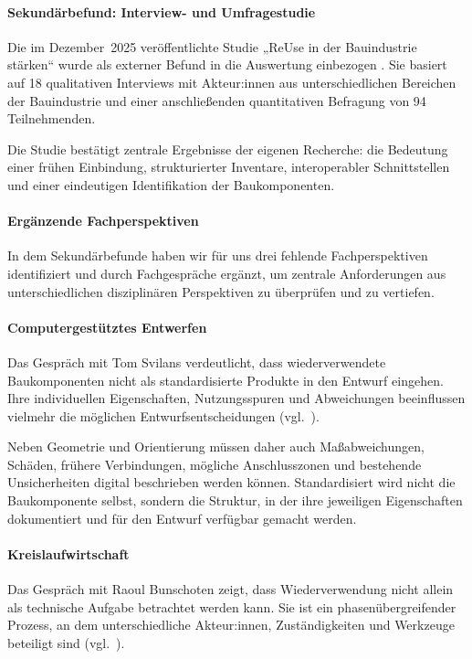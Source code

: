 \documentclass[type=zwischenbericht]{zukunftbau}
\begin{document}
\begin{SemioNest}
\paragraph{Sekundärbefund: Interview- und Umfragestudie}
Die im Dezember~2025 veröffentlichte Studie „ReUse in der Bauindustrie stärken“ wurde als externer Befund in die Auswertung einbezogen \cite{baselcircular-reuse-2025}. Sie basiert auf 18 qualitativen Interviews mit Akteur:innen aus unterschiedlichen Bereichen der Bauindustrie und einer anschließenden quantitativen Befragung von 94 Teilnehmenden.

Die Studie bestätigt zentrale Ergebnisse der eigenen Recherche: die Bedeutung einer frühen Einbindung, strukturierter Inventare, interoperabler Schnittstellen und einer eindeutigen Identifikation der Baukomponenten.

\paragraph{Ergänzende Fachperspektiven}
In dem Sekundärbefunde haben wir für uns drei fehlende Fachperspektiven identifiziert und durch Fachgespräche ergänzt, um zentrale Anforderungen aus unterschiedlichen disziplinären Perspektiven zu überprüfen und zu vertiefen.

\begin{SemioNest}
\paragraph{Computergestütztes Entwerfen}
Das Gespräch mit Tom Svilans verdeutlicht, dass wiederverwendete Baukomponenten nicht als standardisierte Produkte in den Entwurf eingehen. Ihre individuellen Eigenschaften, Nutzungsspuren und Abweichungen beeinflussen vielmehr die möglichen Entwurfsentscheidungen (vgl.\ ).

Neben Geometrie und Orientierung müssen daher auch Maßabweichungen, Schäden, frühere Verbindungen, mögliche Anschlusszonen und bestehende Unsicherheiten digital beschrieben werden können. Standardisiert wird nicht die Baukomponente selbst, sondern die Struktur, in der ihre jeweiligen Eigenschaften dokumentiert und für den Entwurf verfügbar gemacht werden.

\paragraph{Kreislaufwirtschaft}
Das Gespräch mit Raoul Bunschoten zeigt, dass Wiederverwendung nicht allein als technische Aufgabe betrachtet werden kann. Sie ist ein phasenübergreifender Prozess, an dem unterschiedliche Akteur:innen, Zuständigkeiten und Werkzeuge beteiligt sind (vgl.\ ).


\end{SemioNest}
\end{SemioNest}
\end{document}
